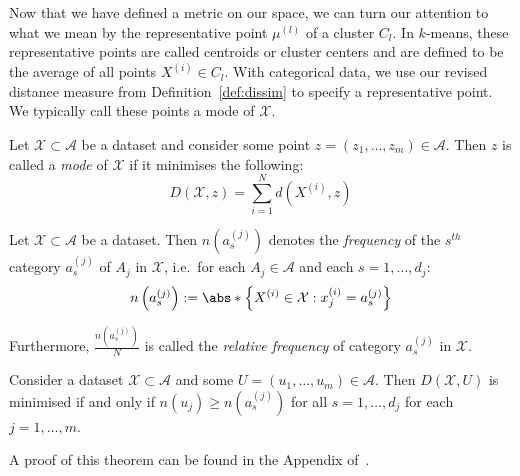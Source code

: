 Now that we have defined a metric on our space, we can turn our attention to
what we mean by the representative point \(\mu^{(l)}\) of a cluster \(C_l\). In
\(k\)-means, these representative points are called centroids or cluster centers
and are defined to be the average of all points \(X^{(i)} \in C_l\). With
categorical data, we use our revised distance measure from
Definition~\ref{def:dissim} to specify a representative point. We typically call
these points a mode of \(\mathcal{X}\).

\begin{definition}\label{def:mode}
    Let \(\mathcal{X} \subset \mathcal{A}\) be a dataset and consider some point
    \(z = \left(z_1, \ldots, z_m\right) \in \mathcal{A}\). Then \(z\) is called
    a \emph{mode} of \(\mathcal{X}\) if it minimises the following:
    \begin{equation}\label{eq:summed-dissim}
        D\left(\mathcal{X}, z\right) = \sum_{i=1}^{N} d\left(X^{(i)}, z\right)
    \end{equation}
\end{definition}

\begin{definition}\label{def:rel-freq}
    Let \(\mathcal{X} \subset \mathcal{A}\) be a dataset. Then
    \(n\left(a_s^{(j)}\right)\) denotes the \emph{frequency} of the \(s^{th}\)
    category \(a_s^{(j)}\) of \(A_j\) in \(\mathcal{X}\), i.e.\ for each \(A_j
    \in \mathcal{A}\) and each \(s = 1, \ldots, d_j\):
    \begin{equation}
        n\left(a_s^{(j)}\right) := \abs*{%
            {\left\{X^{(i)} \in \mathcal{X}: x_j^{(i)} = a_s^{(j)}\right\}}
        }
    \end{equation}
	
    Furthermore, \(\frac{n\left(a_s^{(j)}\right)}{N}\) is called the
    \emph{relative frequency} of category \(a_s^{(j)}\) in \(\mathcal{X}\).
\end{definition}

\begin{theorem}\label{thm:1}
    Consider a dataset \(\mathcal{X} \subset \mathcal{A}\) and some \(U = (u_1,
    \ldots, u_m) \in \mathcal{A}\). Then \(D(\mathcal{X}, U)\) is minimised if
    and only if \(n\left(u_j\right) \geq n\left(a_s^{(j)}\right)\) for all
    \(s=1, \ldots, d_j\) for each \(j = 1, \ldots, m\).

    A proof of this theorem can be found in the Appendix of~\cite{Huang1998}.
\end{theorem}

